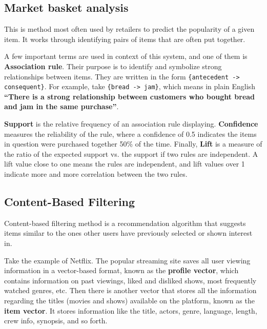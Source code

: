 \documentclass{article}
\begin{document}
\subsection{Market basket analysis}

This is method most often used by retailers to predict the popularity of a given item. It works through identifying pairs of items that are often put together.

\medskip

\noindent A few important terms are used in context of this system, and one of them is \textbf{Association rule}. Their purpose is to identify and symbolize strong relationships between items. They are written in the form \texttt{\{antecedent -> consequent\}}. For example, take \texttt{\{bread -> jam\}}, which means in plain English \textbf{``There is a strong relationship between customers who bought bread and jam in the same purchase''}.

\medskip

\noindent \textbf{Support} is the relative frequency of an association rule displaying. \textbf{Confidence} measures the reliability of the rule, where a confidence of 0.5 indicates the items in question were purchased together 50\% of the time. Finally, \textbf{Lift} is a measure of the ratio of the expected support vs. the support if two rules are independent. A lift value close to one means the rules are independent, and lift values over 1 indicate more and more correlation between the two rules.

\subsection{Content-Based Filtering}

\noindent Content-based filtering method is a recommendation algorithm that suggests items similar to the ones other users have previously selected or shown interest in.

\medskip

\noindent Take the example of Netflix. The popular streaming site saves all user viewing information in a vector-based format, known as the \textbf{profile vector}, which contains information on past viewings, liked and disliked shows, most frequently watched genres, etc. Then there is another vector that stores all the information regarding the titles (movies and shows) available on the platform, known as the \textbf{item vector}. It stores information like the title, actors, genre, language, length, crew info, synopsis, and so forth.
\end{document}
